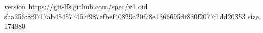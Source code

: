 version https://git-lfs.github.com/spec/v1
oid sha256:8f9717ab454577457f987efbef40829a20f78e1366695df830f2077f1dd20353
size 174880
